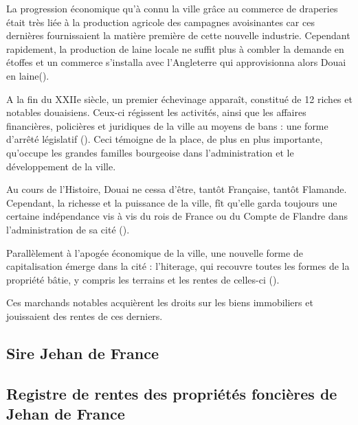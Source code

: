La progression économique qu'à connu la ville grâce au commerce de draperies était très liée à la production agricole des campagnes avoisinantes car ces dernières fournissaient la matière première de cette nouvelle industrie.
Cependant rapidement, la production de laine locale ne suffit plus à combler la demande en étoffes et un commerce s'installa avec l'Angleterre qui approvisionna alors Douai en laine(\cite{clisant_vie_2003}).

A la fin du XXIIe siècle, un premier échevinage apparaît, constitué de 12 riches et notables douaisiens. Ceux-ci régissent les activités, ainsi que les affaires financières, policières et juridiques  de la ville au moyens de bans : une forme d'arrêté législatif (\cite{OfficeDuTourisme_douai_2016}). Ceci témoigne de la place, de plus en plus importante, qu'occupe les grandes familles bourgeoise dans l'administration et le développement de la ville.

Au cours de l'Histoire, Douai ne cessa d'être, tantôt Française, tantôt Flamande. Cependant, la richesse et la puissance de la ville, fît  qu'elle garda toujours une certaine indépendance vis à vis du rois de France ou du Compte de Flandre dans l'administration de sa cité (\cite{mestayer_douai_2016}).

Parallèlement à l'apogée économique de la ville, une nouvelle forme de capitalisation émerge dans la cité : l'hiterage, qui recouvre toutes les formes de la propriété bâtie, y compris les terrains et les rentes de celles-ci (\cite{leguay_propriete_1989}).

Ces marchands notables acquièrent les droits sur les biens immobiliers et jouissaient des rentes de ces derniers.


\subsection{Sire Jehan de France}
\subsection{Registre de rentes des propriétés foncières de Jehan de France}

